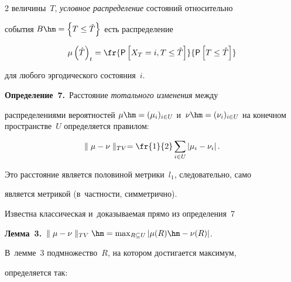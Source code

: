 \begin{multicols}{2}
величины~$T$, \textit{условное распределение} состояний относительно 

события $B\hm = \left\{ T\leq \hat{T}\right\}$ есть распределение 

    $$

    \mu\left( \hat{T}\right)_t= \fr{{\sf P}\left[ X_T=i, T\leq \hat{T}\right]} 

    {{\sf P}\left[ 

T\leq \hat{T}\right]}

    $$

для любого эргодического состояния~$i$.



\smallskip



\noindent

\textbf{Определение~7.}\ Расстояние \textit{тотального изменения} между 

распределениями вероятностей $\mu\hm= (\mu_i)_{i\in U}$ и~$\nu\hm= 

(\nu_i)_{i\in U}$ на конечном пространстве~$U$ определяется правилом: 

$$

\parallel \mu-\nu\parallel_{TV} =\fr{1}{2}\sum\limits_{i\in U} \vert \mu_i -

\nu_i\vert\,.

$$



    Это расстояние является половиной метрики~$l_1$, следовательно, само 

является метрикой (в~част\-ности, симметрично).

    

    \smallskip

    

    Известна классическая и~доказываемая прямо из определения~7 

    

    \smallskip

    

    \noindent

     \textbf{Лемма~3.}\ $\parallel \mu - \nu\parallel_{TV}\hm=\max\nolimits_{R\subseteq U} 

\vert \mu(R)\hm- \nu(R)\vert$.

     

     \smallskip

      

    В~лемме~3 подмножество~$R$, на котором достигается максимум, 

определяется так: $$


\end{multicols}
